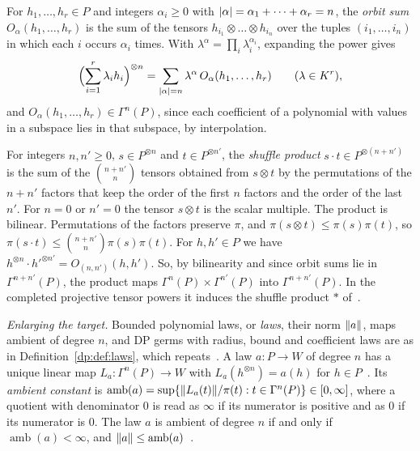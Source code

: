 For $h_1,\dots,h_r\in P$ and integers $\alpha_i\ge0$ with $\lvert \alpha\rvert=\alpha_1+\dots+\alpha_r=n$, the \emph{orbit sum} $O_\alpha(h_1,\dots,h_r)$ is the sum of the tensors $h_{i_1}\otimes\dots\otimes h_{i_n}$ over the tuples $(i_1,\dots,i_n)$ in which each $i$ occurs $\alpha_i$ times. With $\lambda^\alpha=\prod_i\lambda_i^{\alpha_i}$, expanding the power gives~\cite[(14.1)]{I}
\begin{equation}\label{dp:eq:orbit}
 \Bigl(\sum_{i=1}^r\lambda_ih_i\Bigr)^{\otimes n}=\sum_{\lvert \alpha\rvert=n}\lambda^\alpha\,O_\alpha(h_1,\dots,h_r)\qquad(\lambda\in K^r),
\end{equation}
and $O_\alpha(h_1,\dots,h_r)\in\Gamma^n(P)$, since each coefficient of a polynomial with values in a subspace lies in that subspace, by interpolation.

For integers $n,n'\ge0$, $s\in P^{\otimes n}$ and $t\in P^{\otimes n'}$, the \emph{shuffle product} $s\cdot t\in P^{\otimes(n+n')}$ is the sum of the $\binom{n+n'}n$ tensors obtained from $s\otimes t$ by the permutations of the $n+n'$ factors that keep the order of the first $n$ factors and the order of the last $n'$. For $n=0$ or $n'=0$ the tensor $s\otimes t$ is the scalar multiple. The product is bilinear. Permutations of the factors preserve $\pi$, and $\pi(s\otimes t)\le\pi(s)\pi(t)$, so $\pi(s\cdot t)\le\binom{n+n'}n\pi(s)\pi(t)$. For $h,h'\in P$ we have $h^{\otimes n}\cdot h'^{\otimes n'}=O_{(n,n')}(h,h')$. So, by bilinearity and since orbit sums lie in $\Gamma^{n+n'}(P)$, the product maps $\Gamma^n(P)\times\Gamma^{n'}(P)$ into $\Gamma^{n+n'}(P)$. In the completed projective tensor powers it induces the shuffle product $*$ of~\cite[Section~L.3]{I}.

\emph{Enlarging the target.} Bounded polynomial laws, or \emph{laws}, their norm $\lVert a\rVert$, maps ambient of degree $n$, and DP germs with radius, bound and coefficient laws are as in Definition~\ref{dp:def:laws}, which repeats~\cite[Definition~14.8]{I}. A law $a\colon P\to W$ of degree $n$ has a unique linear map $L_a\colon\Gamma^n(P)\to W$ with $L_a(h^{\otimes n})=a(h)$ for $h\in P$~\cite[Lemma~Q.1]{I}. Its \emph{ambient constant} is $\operatorname{amb}(a)=\sup\{\lVert L_a(t)\rVert/\pi(t):t\in\Gamma^n(P)\}\in[0,\infty]$, where a quotient with denominator $0$ is read as $\infty$ if its numerator is positive and as $0$ if its numerator is $0$. The law $a$ is ambient of degree $n$ if and only if $\operatorname{amb}(a)<\infty$, and $\lVert a\rVert\le\operatorname{amb}(a)$~\cite[text after Definition~14.8]{I}.

